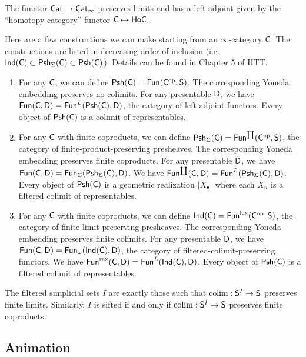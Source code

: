 \documentclass{amsart}
\begin{document}
\begin{ex}
	The functor $\mathsf{Cat} \to \mathsf{Cat}_\infty$ preserves limits and has a left adjoint given by the ``homotopy category'' functor $\mathsf{C} \mapsto \mathsf{Ho} \mathsf{C}$.
\end{ex}

Here are a few constructions we can make starting from an $\infty$-category $\mathsf{C}$.
The constructions are listed in decreasing order of inclusion (i.e.\ $\mathsf{Ind}(\mathsf{C}) \subset \mathsf{Psh}_\Sigma(\mathsf{C}) \subset \mathsf{Psh}(\mathsf{C})$).
Details can be found in Chapter 5 of HTT.
\begin{enumerate}
	\item For any $\mathsf{C}$, we can define $\mathsf{Psh}(\mathsf{C}) = \mathsf{Fun}(\mathsf{C}^{\mathrm{op}}, \mathsf{S})$.
		The corresponding Yoneda embedding preserves no colimits.
		For any presentable $\mathsf{D}$, we have $\mathsf{Fun}(\mathsf{C}, \mathsf{D}) = \mathsf{Fun}^L(\mathsf{Psh}(\mathsf{C}), \mathsf{D})$, the category of left adjoint functors.
		Every object of $\mathsf{Psh}(\mathsf{C})$ is a colimit of representables.
	\item For any $\mathsf{C}$ with finite coproducts, we can define $\mathsf{Psh}_\Sigma(\mathsf{C}) = \mathsf{Fun}^{\prod}(\mathsf{C}^{\mathrm{op}}, \mathsf{S})$, the category of finite-product-preserving presheaves.
		The corresponding Yoneda embedding preserves finite coproducts.
		For any presentable $\mathsf{D}$, we have $\mathsf{Fun}(\mathsf{C}, \mathsf{D}) = \mathsf{Fun}_\Sigma(\mathsf{Psh}_\Sigma(\mathsf{C}), \mathsf{D})$.
		We have $\mathsf{Fun}^{\coprod}(\mathsf{C}, \mathsf{D}) = \mathsf{Fun}^L(\mathsf{Psh}_\Sigma(\mathsf{C}), \mathsf{D})$.
		Every object of $\mathsf{Psh}(\mathsf{C})$ is a geometric realization $|X_\bullet|$ where each $X_n$ is a filtered colimit of representables.
	\item For any $\mathsf{C}$ with finite coproducts, we can define $\mathsf{Ind}(\mathsf{C}) = \mathsf{Fun}^{\mathrm{lex}}(\mathsf{C}^{\mathrm{op}}, \mathsf{S})$, the category of finite-limit-preserving presheaves.
		The corresponding Yoneda embedding preserves finite colimits.
		For any presentable $\mathsf{D}$, we have $\mathsf{Fun}(\mathsf{C}, \mathsf{D}) = \mathsf{Fun}_\omega(\mathsf{Ind}(\mathsf{C}), \mathsf{D})$, the category of filtered-colimit-preserving functors.
		We have $\mathsf{Fun}^{\mathrm{rex}}(\mathsf{C}, \mathsf{D}) = \mathsf{Fun}^L(\mathsf{Ind}(\mathsf{C}), \mathsf{D})$.
		Every object of $\mathsf{Psh}(\mathsf{C})$ is a filtered colimit of representables.
\end{enumerate}

\begin{rmk}
	The filtered simplicial sets $I$ are exactly those such that $\operatorname{colim}: \mathsf{S}^I \to \mathsf{S}$ preserves finite limits.
	Similarly, $I$ is sifted if and only if $\operatorname{colim}: \mathsf{S}^I \to \mathsf{S}$ preserves finite coproducts.
\end{rmk}

\subsection{Animation}
\end{document}
